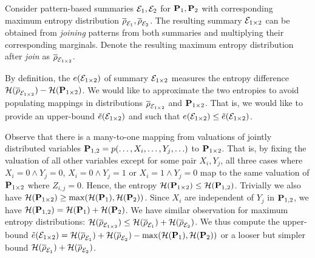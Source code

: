 Consider pattern-based summaries $\mathcal E_1, \mathcal E_2$ for $\mathbf{P}_1,\mathbf{P}_2$ with corresponding maximum entropy distribution $\overline{\rho}_{\mathcal E_1},\overline{\rho}_{\mathcal E_2}$.
The resulting summary $\mathcal E_{1\times2}$ can be obtained from \emph{joining} patterns from both summaries and multiplying their corresponding marginals.
Denote the resulting maximum entropy distribution after \emph{join} as $\overline{\rho}_{\mathcal E_{1\times 2}}$.

By definition, the \Errorname $e(\mathcal E_{1\times 2})$ of summary $\mathcal E_{1\times 2}$ measures the entropy difference $\mathcal{H}(\overline{\rho}_{\mathcal E_{1\times 2}})-\mathcal{H}(\mathbf{P}_{1\times 2})$.
We would like to approximate the two entropies to avoid populating mappings in distributions $\overline{\rho}_{\mathcal E_{1\times 2}}$ and $\mathbf{P}_{1\times 2}$.
That is, we would like to provide an upper-bound $\tilde{e}(\mathcal E_{1\times 2})$ and such that $e(\mathcal E_{1\times 2})\leq \tilde{e}(\mathcal E_{1\times 2})$.

Observe that there is a many-to-one mapping from valuations of jointly distributed variables $\mathbf{P}_{1,2}=p(\ldots,X_i,\ldots,Y_j,\ldots)$ to $\mathbf{P}_{1\times 2}$.
That is, by fixing the valuation of all other variables except for some pair $X_i,Y_j$, all three cases where $X_i=0 \land Y_j=0$, $X_i=0 \land Y_j=1$ or $X_i=1 \land Y_j=0$ map to the same valuation of $\mathbf{P}_{1\times 2}$ where $Z_{i,j}=0$.
Hence, the entropy $\mathcal{H}(\mathbf{P}_{1\times 2})\leq \mathcal{H}(\mathbf{P}_{1,2})$.
Trivially we also have $\mathcal{H}(\mathbf{P}_{1\times 2})\geq \max(\mathcal{H}(\mathbf{P}_1),\mathcal{H}(\mathbf{P}_2))$.
Since $X_i$ are independent of $Y_j$ in $\mathbf{P}_{1,2}$, we have $\mathcal{H}(\mathbf{P}_{1,2})=\mathcal{H}(\mathbf{P}_1)+\mathcal{H}(\mathbf{P}_2)$.
We have similar observation for maximum entropy distributions: $\mathcal{H}(\overline{\rho}_{\mathcal E_{1\times 2}}) \leq \mathcal{H}(\overline{\rho}_{\mathcal E_1})+\mathcal{H}(\overline{\rho}_{\mathcal E_2})$.
We thus compute the upper-bound $\tilde{e}(\mathcal E_{1\times 2})=\mathcal{H}(\overline{\rho}_{\mathcal E_1})+\mathcal{H}(\overline{\rho}_{\mathcal E_2})-\max(\mathcal{H}(\mathbf{P}_1),\mathcal{H}(\mathbf{P}_2))$ or a looser but simpler bound $\mathcal{H}(\overline{\rho}_{\mathcal E_1})+\mathcal{H}(\overline{\rho}_{\mathcal E_2})$.

